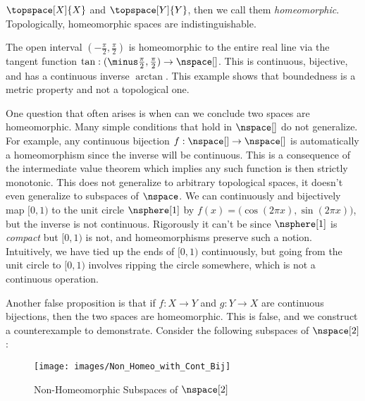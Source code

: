 \documentclass[oneside]{book}                                                  %
\begin{document}
                $\topspace[X]{X}$ and $\topspace[Y]{Y}$, then we call them
                \textit{homeomorphic}. Topologically, homeomorphic spaces are
                indistinguishable.
                \begin{example}
                    The open interval $(\minus\frac{\pi}{2},\frac{\pi}{2})$ is
                    homeomorphic to the entire real line via the tangent
                    function $\tan:(\minus\frac{\pi}{2},\frac{\pi}{2})%
                    \rightarrow\nspace[]$. This is continuous, bijective, and
                    has a continuous inverse $\arctan$. This example shows that
                    boundedness is a metric property and not a topological one.
                \end{example}
                One question that often arises is when can we conclude two
                spaces are homeomorphic. Many simple conditions that hold in
                $\nspace[]$ do not generalize. For example, any continuous
                bijection $f:\nspace[]\rightarrow\nspace[]$ is automatically a
                homeomorphism since the inverse will be continuous. This is a
                consequence of the intermediate value theorem which implies any
                such function is then strictly monotonic. This does not
                generalize to arbitrary topological spaces, it doesn't even
                generalize to subspaces of $\nspace$. We can continuously and
                bijectively map $[0,1)$ to the unit circle $\nsphere[1]$ by
                $f(x)=\big(\cos(2\pi{x}),\sin(2\pi{x})\big)$, but the inverse is
                not continuous. Rigorously it can't be since $\nsphere[1]$ is
                \textit{compact} but $[0,1)$ is not, and homeomorphisms preserve
                such a notion. Intuitively, we have tied up the ends of $[0,1)$
                continuously, but going from the unit circle to $[0,1)$ involves
                ripping the circle somewhere, which is not a continuous
                operation.
                \par\hfill\par
                Another false proposition is that if $f:X\rightarrow{Y}$ and
                $g:Y\rightarrow{X}$ are continuous bijections, then the two
                spaces are homeomorphic. This is false, and we construct a
                counterexample to demonstrate. Consider the following subspaces
                of $\nspace[2]$:
                \begin{figure}[H]
                    \centering
                    \captionsetup{type=figure}
                    \texttt{[image: images/Non\_Homeo\_with\_Cont\_Bij]}
                    \caption{Non-Homeomorphic Subspaces of $\nspace[2]$}
                    \label{fig:Non_Homeomorphic_Subspace}
                \end{figure}
\end{document}
